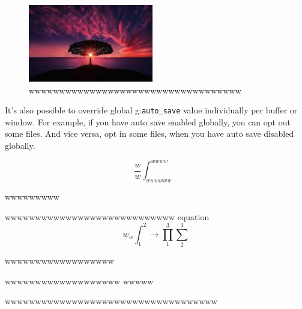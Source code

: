 \documentclass[professionalfont, aspectratio=169]{beamer}
\begin{document}
\begin{frame}
	\begin{figure}
		\begin{center}
			\includegraphics[width=0.3\linewidth]{screenshot002}
		\end{center}
		\caption{wwwwwwwwwwwwwwwwwwwwwwwwwwwwwwwwwww}
		\label{fig:}
	\end{figure}
	It's also possible to override global g:\lstinline{auto_save} value individually per buffer or window. For example, if you have auto save enabled globally, you can opt out some files. And vice versa, opt in some files, when you have auto save disabled globally.


	\begin{equation}
		\frac{w}{w}	\int_{wwwwww}^{wwww}
		\label{www}
	\end{equation}
  
	wwwwwwwww
\end{frame}
\begin{frame}
	wwwwwwwwwwwwwwwwwwwwwwwwwwww
	equation \begin{equation}
		w_w \int_1^2\rightarrow\prod_1^3\sum_2^3
	\end{equation}
\end{frame}

\begin{frame}{wwwwwwwwwwwwwwwwww}
	\begin{block}{wwwwwwwwwwwwwwwwwww}
		wwwww
	\end{block}
	wwwwwwwwwwwwwwwwwwwwwwwwwwwwwwwwwww
\end{frame}
\end{document}
